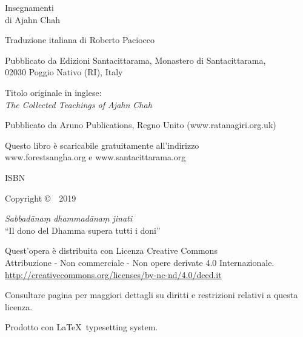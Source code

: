 \cleartoverso
\thispagestyle{empty}

{\copyrightsize
\centering
\setlength{\parindent}{0pt}%
\setlength{\parskip}{0.8\baselineskip}%

Insegnamenti\\
di Ajahn Chah

Traduzione italiana di Roberto Paciocco

Pubblicato da Edizioni Santacittarama, Monastero di Santacittarama,\\
02030 Poggio Nativo (RI), Italy

Titolo originale in inglese:\\
\emph{The Collected Teachings of Ajahn Chah}

Pubblicato da Aruno Publications, Regno Unito (www.ratanagiri.org.uk)

Questo libro è scaricabile gratuitamente all'indirizzo\\
www.forestsangha.org e www.santacittarama.org

ISBN \theISBN

Copyright \copyright\ \thePublisher\ 2019

\emph{Sabbadānaṃ dhammadānaṃ jinati}\\
``Il dono del Dhamma supera tutti i doni''

\vfill

{\footnotesize
Quest'opera è distribuita con Licenza Creative Commons\\
Attribuzione - Non commerciale - Non opere derivate 4.0 Internazionale.\\
\href{http://creativecommons.org/licenses/by-nc-nd/4.0/deed.it}{http://creativecommons.org/licenses/by-nc-nd/4.0/deed.it}

Consultare pagina \pageref{copyright-details} per maggiori dettagli su diritti e restrizioni relativi a questa licenza.

Prodotto con \LaTeX\ typesetting system.


\theEditionInfo

}}
